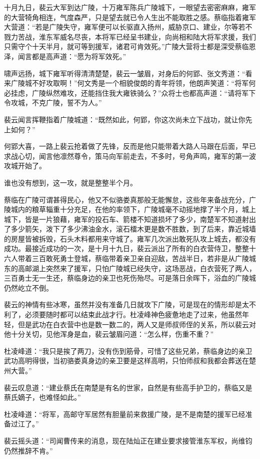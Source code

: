十月九日，裴云大军到达广陵，十万雍军陈兵广陵城下，一眼望去密密麻麻，雍军的大营犄角相连，气度森严，只是望去就已令人生出不能取胜之感。蔡临指着雍军大营道：“若是广陵失守，雍军便可以长驱直入扬州，威胁京口、建业，尔等若不戮力苦战，淮东军威名尽丧，本将军已经呈书建业，向尚相和陆大将军求援，我们只需守个十天半月，就可等到援军，诸君可肯效死。”广陵大营将士都是深受蔡临恩泽，闻言都是高声道：“愿为将军效死。”

啸声远扬，城下雍军听得清清楚楚，裴云一皱眉，对身后的何郢、张文秀道：“看来广陵城不好攻取啊！”何文秀是一个相貌俊朗的青年将领，他朗声笑道：“将军何必挂虑，广陵纵然难攻，还能挡住我大雍铁骑么？”众将士也都高声道：“请将军下令攻城，不克广陵，誓不为人。”

裴云闻言挥鞭指着广陵城道：“既然如此，何郢，你这次尚未立下战功，就让你先上如何？”

何郢大喜，一路上裴云抢着做了先锋，反而是他只能带着大路人马跟在后面，早已求战心切，闻言他凛然尊令，策马向军前走去，不多时，号角声鸣，雍军的第一波攻城开始了。

谁也没有想到，这一攻，就是整整半个月。

蔡临在广陵可谓甚得民心，他又不似骆娄真那般无能懈怠，这些年来备战充分，广陵城内的粮草辎重十分充足，在他的率领下，广陵城毫不动摇地撑了半个月，城上城下，皆是一片狼藉，雍军的投石车、箭楼不知道损坏了多少，南楚军不知道射出了多少箭矢，泼下了多少沸油金水，滚石檑木更是数不胜数，到了后来，靠近城墙的房屋皆被拆毁，石头木料都用来守城了。雍军几次派出敢死队攻上城去，都没有成功。最接近成功的一次，是十月十九日，裴云派出了所有的白衣营侍卫，整整十六人带着三百敢死勇士登城，蔡临带着亲卫亲自迎敌，苦战半日，若非是从广陵城东的高邮湖上突然来了援军，只怕广陵城已经失守，这场恶战，白衣营死了两人，三百勇士无一生还，蔡临身边的亲卫也死伤殆尽。可是落日余晖下，浴血的广陵城仍然屹立不倒。

裴云的神情有些冰寒，虽然并没有准备几日就攻下广陵，可是现在的情形却是太不利了，必须要随时都可以结束此战才行。杜凌峰神色疲惫地走了过来，他虽然年轻，但是武功在白衣营中也是数一数二的，两人又是师叔师侄的关系，所以裴云对他十分关切，见他浑身是血，裴云皱眉问道：“怎么样，伤重不重？”

杜凌峰道：“我只是挨了两刀，没有伤到筋骨，可惜了这些兄弟，蔡临身边的亲卫武功高明得很，当初骆娄真身边的亲卫要是这样高明，只怕师叔和我都会葬送在楚州大营。”

裴云叹息道：“建业蔡氏在南楚是有名的世家，自然是有些高手护卫的，蔡临又是蔡氏嫡子，也难怪如此。”

杜凌峰道：“将军，高邮守军居然有胆量前来救援广陵，是不是南楚的援军已经准备过江了。”

裴云摇头道：“司闻曹传来的消息，现在陆灿正在建业要求接管淮东军权，尚维钧仍然推辞不肯。”

